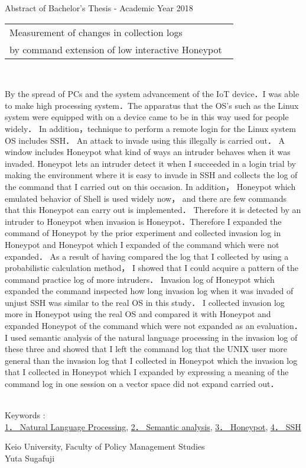 Abstract of Bachelor's Thesis - Academic Year 2018
\begin{center}
\begin{large}
\begin{tabular}{|M{0.97\linewidth}|}
    \hline
        Measurement of changes in collection logs\\
        by command extension of low interactive Honeypot\\
    \hline
\end{tabular}
\end{large}
\end{center}

~ \\
\renewcommand{\baselinestretch}{0.9}

By the spread of PCs and the system advancement of the IoT device．I was able to make high processing system．The apparatus that the OS's such as the Linux system were equipped with on a device came to be in this way used for people widely． In addition，technique to perform a remote login for the Linux system OS includes SSH． An attack to invade using this illegally is carried out．
A window includes Honeypot what kind of ways an intruder behaves when it was invaded. Honeypot lets an intruder detect it when I succeeded in a login trial by making the environment where it is easy to invade in SSH and collects the log of the command that I carried out on this occasion. In addition， Honeypot which emulated behavior of Shell is used widely now， and there are few commands that this Honeypot can carry out is implemented． Therefore it is detected by an intruder to Honeypot when invasion is Honeypot．Therefore I expanded the command of Honeypot by the prior experiment and collected invasion log in Honeypot and Honeypot which I expanded of the command which were not expanded． As a result of having compared the log that I collected by using a probabilistic calculation method， I showed that I could acquire a pattern of the command practice log of more intruders． Invasion log of Honeypot which expanded the command inspected how long invasion log when it was invaded of unjust SSH was similar to the real OS in this study． I collected invasion log more in Honeypot using the real OS and compared it with Honeypot and expanded Honeypot of the command which were not expanded as an evaluation． I used semantic analysis of the natural language processing in the invasion log of these three and showed that I left the command log that the UNIX user more general than the invasion log that I collected in Honeypot which the invasion log that I collected in Honeypot which I expanded by expressing a meaning of the command log in one session on a vector space did not expand carried out．

\renewcommand{\baselinestretch}{1.0}

~ \\
Keywords : \\
\underline{1． Natural Language Processing},
\underline{2． Semantic analysis},
\underline{3． Honeypot},
\underline{4． SSH}
\begin{flushright}
Keio University, Faculty of Policy Management Studies\\
Yuta Sugafuji
\end{flushright}
